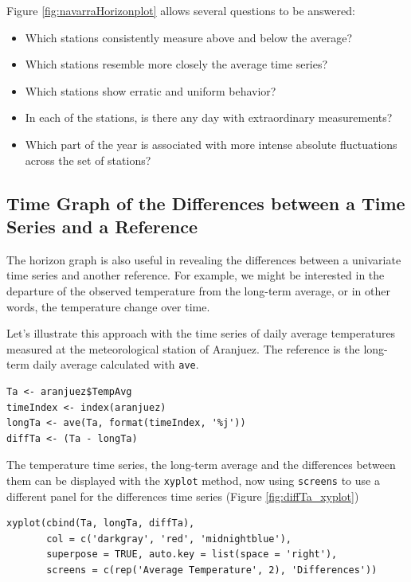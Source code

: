 \documentclass[smallroyalvopaper]{memoir}
\begin{document}
Figure \ref{fig:navarraHorizonplot} allows several questions to be
answered:
\begin{itemize}
\item Which stations consistently measure above and below the average?
\item Which stations resemble more closely the average time series?
\item Which stations show erratic and uniform behavior?
\item In each of the stations, is there any day with extraordinary measurements?
\item Which part of the year is associated with more intense
absolute fluctuations across the set of stations?
\end{itemize}

\subsection{Time Graph of the Differences between a Time Series and a Reference \label{sec:differences}}
\label{sec:orgea74b41}

The horizon graph is also useful in revealing the differences between
a univariate time series and another reference. For example, we
might be interested in the departure of the observed temperature
from the long-term average, or in other words, the temperature
change over time.

Let's illustrate this approach with the time series of daily
average temperatures measured at the meteorological station of
Aranjuez. The reference is the long-term daily average calculated
with \texttt{ave}.

\lstset{language=r,label= ,caption= ,captionpos=b,numbers=none}
\begin{lstlisting}
Ta <- aranjuez$TempAvg
timeIndex <- index(aranjuez)
longTa <- ave(Ta, format(timeIndex, '%j'))
diffTa <- (Ta - longTa)
\end{lstlisting}


The temperature time series, the long-term average and the
differences between them can be displayed with the \texttt{xyplot}
method, now using \texttt{screens} to use a different panel for the
differences time series (Figure \ref{fig:diffTa_xyplot})
\lstset{language=r,label= ,caption= ,captionpos=b,numbers=none}
\begin{lstlisting}
xyplot(cbind(Ta, longTa, diffTa),
       col = c('darkgray', 'red', 'midnightblue'),
       superpose = TRUE, auto.key = list(space = 'right'),
       screens = c(rep('Average Temperature', 2), 'Differences'))
\end{lstlisting}
\end{document}
